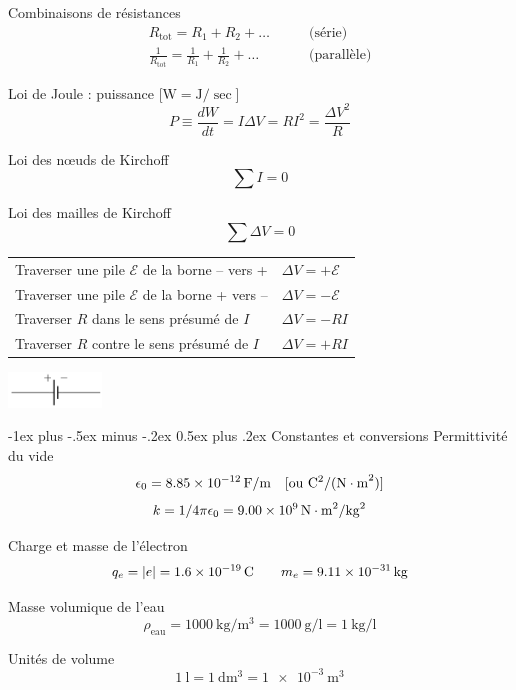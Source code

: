 \documentclass[10pt,landscape]{article}
\makeatletter
\renewcommand{\section}{\@startsection{section}{1}{0mm}%
                                {-1ex plus -.5ex minus -.2ex}%
                                {0.5ex plus .2ex}%
                                {\normalfont\large\bfseries}}
\newcommand{\tableindent}{\hspace{1.5em}}
\newcommand{\emf}{\ensuremath{\mathcal{E}}}
\makeatother
\begin{document}
\begin{multicols}{3}
Combinaisons de résistances
\begin{align*}
R_\text{tot} = R_1 + R_2 + \dots \qquad & \text{(série)} \\
\frac{1}{R_\text{tot}} = \frac{1}{R_1} + \frac{1}{R_2} + \dots \qquad & \text{(parallèle)}
\end{align*}

Loi de Joule : puissance [$\si{\watt} = \si{\joule}/\si{\sec}$]
\[ P \equiv \frac{dW}{dt} = I \Delta V = R I^2  = \frac{\Delta V^2}{R}\]

Loi des nœuds de Kirchoff
\[ \sum I = 0 \]

Loi des mailles de Kirchoff
\[ \sum \Delta V = 0 \]

\begin{tabular}{@{\tableindent}ll@{}}
	Traverser une pile $\emf$ de la borne -- vers + & $\Delta V  = +\emf$ \\
	Traverser une pile $\emf$ de la borne + vers -- & $\Delta V  = -\emf$ \\
 	Traverser $R$ dans le sens présumé de $I$ & $\Delta V  = -RI$ \\
	Traverser $R$ contre le sens présumé de $I$ & $\Delta V  = +RI$ 
\end{tabular}

\begin{center}
	\includegraphics[width=25mm]{./phy1522/pile.png}
\end{center}

\hrulefill
\section{Constantes et conversions}
Permittivité du vide
\[ 	\epsilon_0 = \SI{8,85E-12}{{\farad}/{\meter}} \quad [\text{ou } \si{{\coulomb^2}/{(\newton\cdot\meter^2)}}] \]
\[	k = {1}/{4\pi\epsilon_0} = \SI{9,00E9}{\newton\cdot\meter^2/\kilogram^2}\]

Charge et masse de l'électron
\begin{gather*}
q_e = |e| = \SI{1,6E-19}{\coulomb}
\qquad m_e = \SI{9,11E-31}{\kilogram}
\end{gather*}

Masse volumique de l'eau
\[ \rho_\text{eau} = \SI{1000}{\kilogram/\meter^3} = \SI{1000}{\gram/\litre}  = \SI{1}{\kilogram/\litre} \]

Unités de volume
\[ \SI{1}{\litre} = \SI{1}{\deci\meter^3} =  \SI{1e-3}{\meter^3} \]


\end{multicols}
\end{document}
